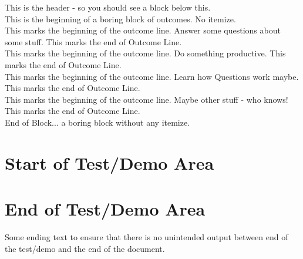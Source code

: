 \documentclass{ximera}
\begin{document}
This is the header - so you should see a block below this.\\
This is the beginning of a boring block of outcomes. No itemize.\\
This marks the beginning of the outcome line. Answer some questions about some stuff. This marks the end of Outcome Line.\\
This marks the beginning of the outcome line. Do something productive. This marks the end of Outcome Line.\\
This marks the beginning of the outcome line. Learn how Questions work maybe. This marks the end of Outcome Line.\\
This marks the beginning of the outcome line. Maybe other stuff - who knows! This marks the end of Outcome Line.\\
End of Block... a boring block without any itemize.




\section{Start of Test/Demo Area}

\displayOutcomes

\section{End of Test/Demo Area}

Some ending text to ensure that there is no unintended output between end of the test/demo and the end of the document.
\end{document}
